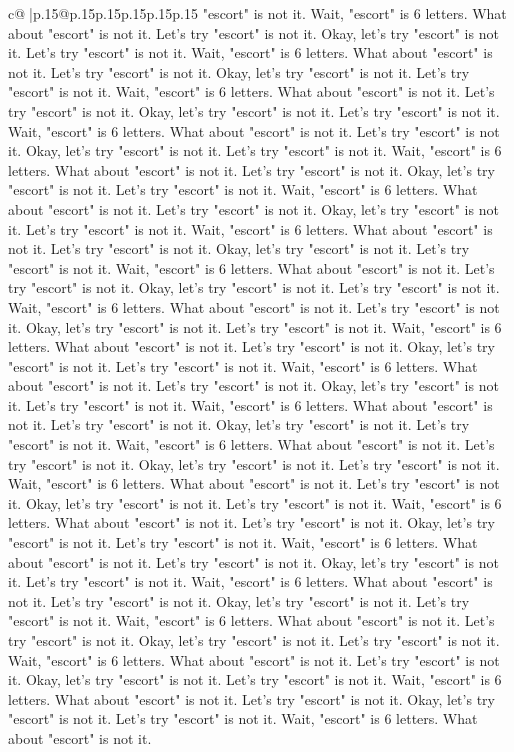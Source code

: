 \documentclass{article}
\begin{document}
{\begin{supertabular}{c@{$\;$}|p{.15\linewidth}@{}p{.15\linewidth}p{.15\linewidth}p{.15\linewidth}p{.15\linewidth}p{.15\linewidth}}
{{{"escort" is not it. Wait, "escort" is 6 letters. What about "escort" is not it. Let's try "escort" is not it. Okay, let's try "escort" is not it. Let's try "escort" is not it. Wait, "escort" is 6 letters. What about "escort" is not it. Let's try "escort" is not it. Okay, let's try "escort" is not it. Let's try "escort" is not it. Wait, "escort" is 6 letters. What about "escort" is not it. Let's try "escort" is not it. Okay, let's try "escort" is not it. Let's try "escort" is not it. Wait, "escort" is 6 letters. What about "escort" is not it. Let's try "escort" is not it. Okay, let's try "escort" is not it. Let's try "escort" is not it. Wait, "escort" is 6 letters. What about "escort" is not it. Let's try "escort" is not it. Okay, let's try "escort" is not it. Let's try "escort" is not it. Wait, "escort" is 6 letters. What about "escort" is not it. Let's try "escort" is not it. Okay, let's try "escort" is not it. Let's try "escort" is not it. Wait, "escort" is 6 letters. What about "escort" is not it. Let's try "escort" is not it. Okay, let's try "escort" is not it. Let's try "escort" is not it. Wait, "escort" is 6 letters. What about "escort" is not it. Let's try "escort" is not it. Okay, let's try "escort" is not it. Let's try "escort" is not it. Wait, "escort" is 6 letters. What about "escort" is not it. Let's try "escort" is not it. Okay, let's try "escort" is not it. Let's try "escort" is not it. Wait, "escort" is 6 letters. What about "escort" is not it. Let's try "escort" is not it. Okay, let's try "escort" is not it. Let's try "escort" is not it. Wait, "escort" is 6 letters. What about "escort" is not it. Let's try "escort" is not it. Okay, let's try "escort" is not it. Let's try "escort" is not it. Wait, "escort" is 6 letters. What about "escort" is not it. Let's try "escort" is not it. Okay, let's try "escort" is not it. Let's try "escort" is not it. Wait, "escort" is 6 letters. What about "escort" is not it. Let's try "escort" is not it. Okay, let's try "escort" is not it. Let's try "escort" is not it. Wait, "escort" is 6 letters. What about "escort" is not it. Let's try "escort" is not it. Okay, let's try "escort" is not it. Let's try "escort" is not it. Wait, "escort" is 6 letters. What about "escort" is not it. Let's try "escort" is not it. Okay, let's try "escort" is not it. Let's try "escort" is not it. Wait, "escort" is 6 letters. What about "escort" is not it. Let's try "escort" is not it. Okay, let's try "escort" is not it. Let's try "escort" is not it. Wait, "escort" is 6 letters. What about "escort" is not it. Let's try "escort" is not it. Okay, let's try "escort" is not it. Let's try "escort" is not it. Wait, "escort" is 6 letters. What about "escort" is not it. Let's try "escort" is not it. Okay, let's try "escort" is not it. Let's try "escort" is not it. Wait, "escort" is 6 letters. What about "escort" is not it. Let's try "escort" is not it. Okay, let's try "escort" is not it. Let's try "escort" is not it. Wait, "escort" is 6 letters. What about "escort" is not it. Let's try "escort" is not it. Okay, let's try "escort" is not it. Let's try "escort" is not it. Wait, "escort" is 6 letters. What about "escort" is not it. }}}
\end{supertabular}}
\end{document}
